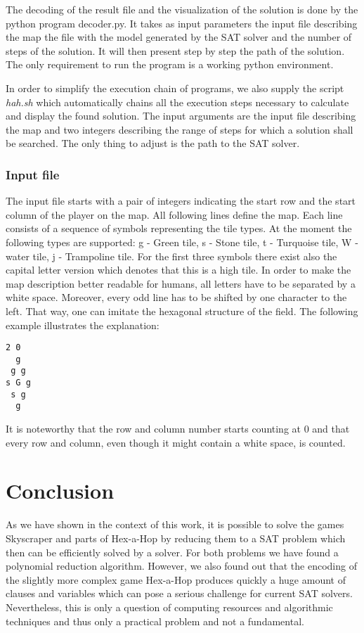 \documentclass[a4paper, 12pt, titlepage]{article}
\begin{document}
The decoding of the result file and the visualization of the solution is done by the python program decoder.py. 
It takes as input parameters the input file describing the map the file with the model generated by the SAT solver and the number of steps of the solution. 
It will then present step by step the path of the solution. 
The only requirement to run the program is a working python environment. 

In order to simplify the execution chain of programs, we also supply the script \emph{hah.sh} which automatically chains all the execution steps necessary to calculate and display the found solution. The input arguments are the input file describing the map and two integers describing the range of steps for which a solution shall be searched. The only thing to adjust is the path to the SAT solver.

\subsubsection{Input file}

The input file starts with a pair of integers indicating the start row and the start column of the player on the map. 
All following lines define the map. 
Each line consists of a sequence of symbols representing the tile types. 
At the moment the following types are supported: \pmb g - Green tile, \pmb s - Stone tile, \pmb t - Turquoise tile, \pmb W - water tile, \pmb j - Trampoline tile. 
For the first three symbols there exist also the capital letter version which denotes that this is a high tile. 
In order to make the map description better readable for humans, all letters have to be separated by a white space. 
Moreover, every odd line has to be shifted by one character to the left. 
That way, one can imitate the hexagonal structure of the field. 
The following example illustrates the explanation:
\begin{verbatim}
2 0
  g
 g g
s G g
 s g
  g	
\end{verbatim}
It is noteworthy that the row and column number starts counting at 0 and that every row and column, even though it might contain a white space, is counted.


\section{Conclusion}

As we have shown in the context of this work, it is possible to solve the games Skyscraper and parts of Hex-a-Hop by reducing them to a SAT problem which then can be efficiently solved by a solver. 
For both problems we have found a polynomial reduction algorithm.
However, we also found out that the encoding of the slightly more complex game Hex-a-Hop produces quickly a huge amount of clauses and variables which can pose a serious challenge for current SAT solvers.
Nevertheless, this is only a question of computing resources and algorithmic techniques and thus only a practical problem and not a fundamental.
\end{document}
